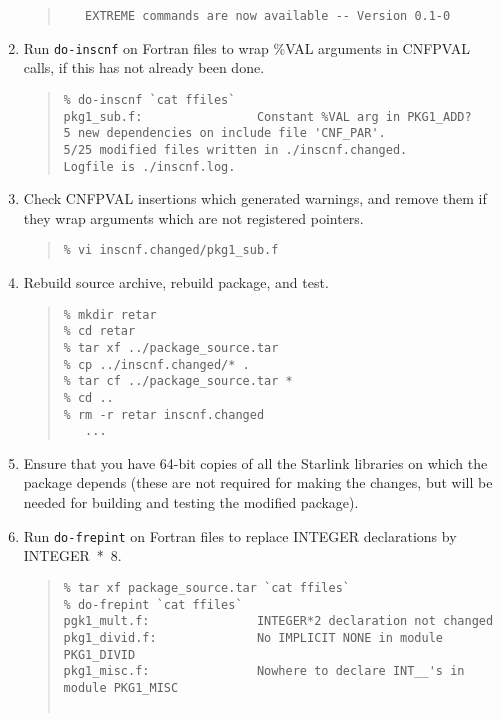 \documentclass[twoside,11pt]{article}
\newcommand{\htmlref}[2]{#1}
\newcommand{\html}[1]{}
\renewcommand{\_}{\texttt{\symbol{95}}}
\newcommand{\xdofilter}[1]{\htmlref{{\tt do-#1}}{do-xxx}}
\newenvironment{squote}{\begin{quote}\begin{small}}{\end{small}\end{quote}}
\begin{document}
\begin{enumerate}
\begin{squote}
\begin{verbatim}
   EXTREME commands are now available -- Version 0.1-0
\end{verbatim}
\end{squote}
%
\item
Run \xdofilter{inscnf} on Fortran files 
to wrap \%VAL arguments in CNF\_PVAL calls,
if this has not already been done.
\begin{squote}
\begin{verbatim}
% do-inscnf `cat ffiles`
pkg1_sub.f:                Constant %VAL arg in PKG1_ADD?
5 new dependencies on include file 'CNF_PAR'.
5/25 modified files written in ./inscnf.changed.
Logfile is ./inscnf.log.
\end{verbatim}
\end{squote}
%
\item
Check CNF\_PVAL insertions which generated warnings,
and remove them if they wrap arguments which are not registered pointers.
\begin{squote}
\begin{verbatim}
% vi inscnf.changed/pkg1_sub.f
\end{verbatim}
\end{squote}
%
\item
Rebuild source archive, rebuild package, and test.
\begin{squote}
\begin{verbatim}
% mkdir retar
% cd retar
% tar xf ../package_source.tar
% cp ../inscnf.changed/* .
% tar cf ../package_source.tar *
% cd ..
% rm -r retar inscnf.changed
   ...
\end{verbatim}
\end{squote}
%
\item
Ensure that you have 64-bit copies of all the Starlink libraries on which the
package depends (these are not required for making the changes, but 
will be needed for building and testing the modified package).
\html{\begin{squote}\end{squote}}
\item
Run \xdofilter{frepint} on Fortran files to replace INTEGER declarations
by INTEGER~*~8.
\begin{squote}
\begin{verbatim}
% tar xf package_source.tar `cat ffiles`
% do-frepint `cat ffiles`
pgk1_mult.f:               INTEGER*2 declaration not changed                 
pkg1_divid.f:              No IMPLICIT NONE in module PKG1_DIVID
pkg1_misc.f:               Nowhere to declare INT__'s in module PKG1_MISC


\end{verbatim}
\end{squote}
\end{enumerate}
\end{document}
